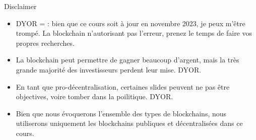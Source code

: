 \begin{frame}{Disclaimer}
  \begin{itemize}
    \item DYOR =  : bien que ce cours soit à jour en novembre 2023, je peux m'être trompé. La blockchain n'autorisant pas l'erreur, prenez le temps de faire vos propres recherches.
    \item La blockchain peut permettre de gagner beaucoup d'argent, mais la très grande majorité des investisseurs perdent leur mise. DYOR.
    \item En tant que pro-décentralisation, certaines slides peuvent ne pas être objectives, voire tomber dans la poilitique. DYOR.
    \item Bien que nous évoquerons l'ensemble des types de blockchains, nous utiliserons uniquement les blockchains publiques et décentralisées dans ce cours.
  \end{itemize}
\end{frame}